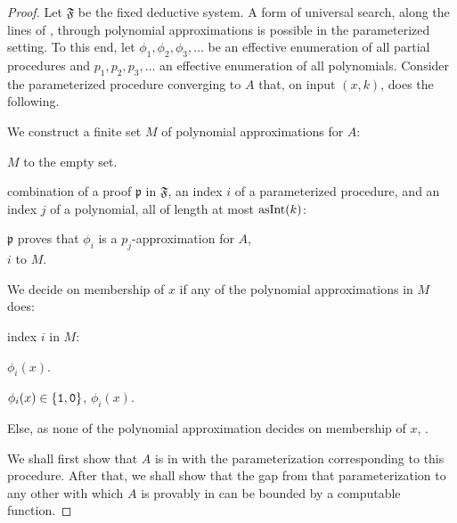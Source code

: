 \begin{proof}
  Let $\mathfrak{F}$ be the fixed deductive system.
  A form of universal search, along the lines of \textcite{hutter2002fastest}, through polynomial approximations is possible in the parameterized setting.
  To this end, let $\phi_1, \phi_2, \phi_3, \ldots$ be an effective enumeration of all partial procedures and $p_1, p_2, p_3, \ldots$ an effective enumeration of all polynomials.
  Consider the parameterized procedure converging to $A$ that, on input $(x, k)$, does the following.
  \begin{codelisting}
  \item
    We construct a finite set $M$ of polynomial approximations for $A$:
    \begin{codelisting}
    \item
       $M$ to the empty set.
    \item
       combination of a proof $\mathfrak{p}$ in $\mathfrak{F}$, an index $i$ of a parameterized procedure, and an index $j$ of a polynomial, all of length at most $\asNat(k)$:
      \begin{codelisting}
      \item\label{alg:xpprincipal:approximations}
         $\mathfrak{p}$ proves that $\phi_i$ is a $p_j$-approximation for $A$,
        \\\-\quad {} $i$ to $M$.
      \end{codelisting}
    \end{codelisting}
  \item
    We decide on membership of $x$ if any of the polynomial approximations in $M$ does:
    \begin{codelisting}
    \item
       index $i$ in $M$:
      \begin{codelisting}
      \item
         $\phi_i(x)$.
      \item
         $\phi_i(x) \in \{\bits{1}, \bits{0}\}$,  $\phi_i(x)$.
      \end{codelisting}
    \item
      Else, as none of the polynomial approximation decides on membership of $x$,  .
    \end{codelisting}
  \end{codelisting}

  We shall first show that $A$ is in  with the parameterization corresponding to this procedure.
  After that, we shall show that the gap from that parameterization to any other with which $A$ is provably in  can be bounded by a computable function.


\end{proof}
